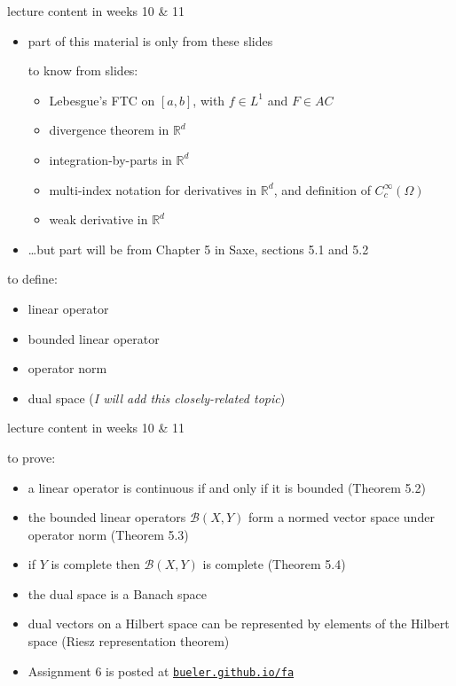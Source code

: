 \documentclass[10pt,
               svgnames,
               hyperref={colorlinks,
                         citecolor=DeepPink4,
                         linkcolor=FireBrick,
                         urlcolor=blue},
               usepdftitle=false]{beamer}
\newcommand{\cB}{\mathcal{B}}
\newcommand{\RR}{\mathbb{R}}
\begin{document}
\begin{frame}{lecture content in weeks 10 \& 11}

\begin{itemize}
\item part of this material is only from these slides

\begin{block}{to know from slides:}
\begin{itemize}
\small
\item Lebesgue's FTC on $[a,b]$, with $f\in L^1$ and $F \in AC$
\item divergence theorem in $\RR^d$
\item integration-by-parts in $\RR^d$
\item multi-index notation for derivatives in $\RR^d$, and definition of $C_c^\infty(\Omega)$
\item weak derivative in $\RR^d$
\end{itemize}
\end{block}

\item \dots but part will be from Chapter 5 in Saxe, sections 5.1 and 5.2
\end{itemize}

\begin{block}{to define:}
\begin{itemize}
\small
\item linear operator
\item bounded linear operator
\item operator norm
\item dual space \quad (\emph{I will add this closely-related topic})
\end{itemize}
\end{block}
\end{frame}


\begin{frame}{lecture content in weeks 10 \& 11}

\begin{block}{to prove:}
\begin{itemize}
\item a linear operator is continuous if and only if it is bounded (Theorem 5.2)
\item the bounded linear operators $\cB(X,Y)$ form a normed vector space under operator norm (Theorem 5.3)
\item if $Y$ is complete then $\cB(X,Y)$ is complete (Theorem 5.4)
\item the dual space is a Banach space
\item dual vectors on a Hilbert space can be represented by elements of the Hilbert space (Riesz representation theorem)
\end{itemize}
\end{block}

\begin{itemize}
\item Assignment 6 is posted at \quad  \href{https://bueler.github.io/fa/index.html}{\texttt{bueler.github.io/fa}}
\end{itemize}
\end{frame}
\end{document}
